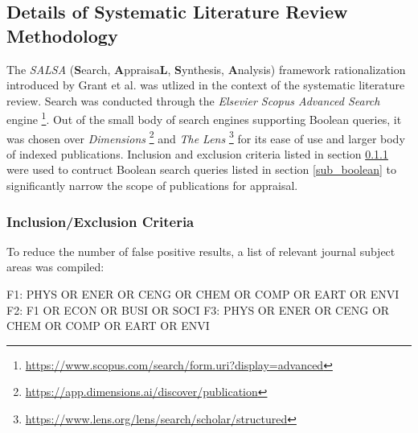 \documentclass{article}
\begin{document}
    \subsection{Details of Systematic Literature Review Methodology}
    
        The \textit{SALSA} (\textbf{S}earch, \textbf{A}ppraisa\textbf{L}, \textbf{S}ynthesis, \textbf{A}nalysis) framework rationalization introduced by Grant et al. \cite{grant_typology_2009} was utlized in the context of the systematic literature review. Search was conducted through the \textit{Elsevier Scopus Advanced Search} engine \footnote{\url{https://www.scopus.com/search/form.uri?display=advanced}}. Out of the small body of search engines supporting Boolean queries, it was chosen over \textit{Dimensions} \footnote{\url{https://app.dimensions.ai/discover/publication}} and \textit{The Lens} \footnote{\url{https://www.lens.org/lens/search/scholar/structured}} for its ease of use and larger body of indexed publications. Inclusion and exclusion criteria listed in section \ref{subsub_inclusion_exclusion} were used to contruct Boolean search queries listed in section \ref{sub_boolean} to significantly narrow the scope of publications for appraisal. 
        
        \subsubsection{Inclusion/Exclusion Criteria}
        \label{subsub_inclusion_exclusion}
        
            To reduce the number of false positive results, a list of relevant journal subject areas was compiled:
            
\begin{code_search}
F1: PHYS OR ENER OR CENG OR CHEM OR COMP OR EART OR ENVI
F2: F1 OR ECON OR BUSI OR SOCI
F3: PHYS OR ENER OR CENG OR CHEM OR COMP OR EART OR ENVI
\end{code_search}
\end{document}
